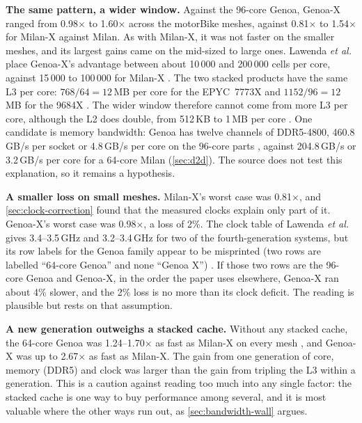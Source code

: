 \textbf{The same pattern, a wider window.} Against the 96-core Genoa, Genoa-X ranged from 0.98$\times$ to 1.60$\times$ across the motorBike meshes, against 0.81$\times$ to 1.54$\times$ for Milan-X against Milan. As with Milan-X, it was not faster on the smaller meshes, and its largest gains came on the mid-sized to large ones. Lawenda \emph{et al.} place Genoa-X's advantage between about 10\,000 and 200\,000 cells per core, against 15\,000 to 100\,000 for Milan-X \cite{lawendaEvaluatingImpactL32025}. The two stacked products have the same L3 per core: $768/64 = 12$\,MB per core for the EPYC~7773X \cite{lawendaEvaluatingImpactL32025} and $1152/96 = 12$\,MB for the 9684X \cite{advancedmicrodevicesinc.AMDEPYC90042023}. The wider window therefore cannot come from more L3 per core, although the L2 does double, from 512\,KB to 1\,MB per core \cite{lawendaEvaluatingImpactL32025}. One candidate is memory bandwidth: Genoa has twelve channels of DDR5-4800, 460.8\,GB/s per socket or 4.8\,GB/s per core on the 96-core parts \cite{advancedmicrodevicesinc.AMDEPYC90042023}, against 204.8\,GB/s or 3.2\,GB/s per core for a 64-core Milan (\cref{sec:d2d}). The source does not test this explanation, so it remains a hypothesis.

\textbf{A smaller loss on small meshes.} Milan-X's worst case was 0.81$\times$, and \cref{sec:clock-correction} found that the measured clocks explain only part of it. Genoa-X's worst case was 0.98$\times$, a loss of 2\%. The clock table of Lawenda \emph{et al.} gives 3.4--3.5\,GHz and 3.2--3.4\,GHz for two of the fourth-generation systems, but its row labels for the Genoa family appear to be misprinted (two rows are labelled ``64-core Genoa'' and none ``Genoa X'') \cite[Table~5]{lawendaEvaluatingImpactL32025}. If those two rows are the 96-core Genoa and Genoa-X, in the order the paper uses elsewhere, Genoa-X ran about 4\% slower, and the 2\% loss is no more than its clock deficit. The reading is plausible but rests on that assumption.

\textbf{A new generation outweighs a stacked cache.} Without any stacked cache, the 64-core Genoa was 1.24--1.70$\times$ as fast as Milan-X on every mesh \cite{lawendaEvaluatingImpactL32025}, and Genoa-X was up to 2.67$\times$ as fast as Milan-X. The gain from one generation of core, memory (DDR5) and clock was larger than the gain from tripling the L3 within a generation. This is a caution against reading too much into any single factor: the stacked cache is one way to buy performance among several, and it is most valuable where the other ways run out, as \cref{sec:bandwidth-wall} argues.

